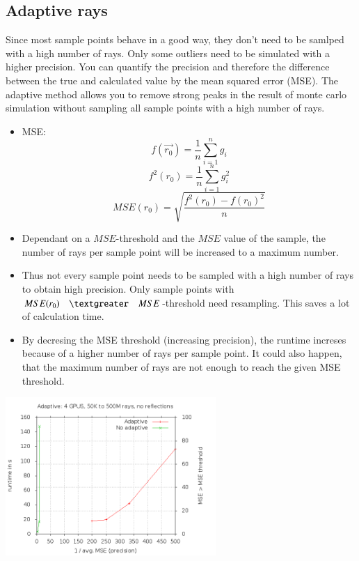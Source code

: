 \subsection{Adaptive rays}
Since most sample points behave in a good way, they don't need
to be samlped with a high number of rays. Only some outliers need to
be simulated with a higher precision. You can quantify the precision
and therefore the difference between the true and calculated value by
the mean squared error (MSE).
The adaptive method allows you to remove strong peaks in the result
of monte carlo simulation without sampling all sample points with
a high number of rays.
\begin{itemize}
\item MSE: 
     \[f(\vec{r_0}) = \frac{1}{n} \sum_{i=1}^n g_i \]
     \[f^2(r_0) = \frac{1}{n} \sum_{i=1}^n g_i^2 \]
     \[MSE(r_0) = \sqrt{\frac{f^2(r_0) - f(r_0)^2}{n}}\]
\item Dependant on a $MSE$-threshold and the $MSE$ value
  of the sample, the number of rays per sample point 
  will be increased to a maximum number.
\item Thus not every sample point needs to be sampled
  with a high number of rays to obtain high precision.
  Only sample points with $MSE(r_0) \quad \textgreater \quad MSE$-threshold need
  resampling. This saves a lot of calculation time.
\item By decresing the MSE threshold (increasing precision), the runtime increses because
  of a higher number of rays per sample point. It could also happen, that the maximum number
  of rays are not enough to reach the given MSE threshold.
\end{itemize}
\begin{center}
  \includegraphics[width=8cm]{plot/adaptive.png}
\end{center}
